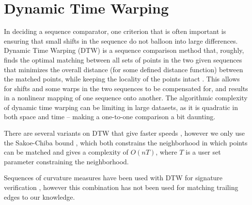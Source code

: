 \section{Dynamic Time Warping}

In deciding a sequence comparator, one criterion that is often important is ensuring that small shifts in the sequence do not balloon into large differences.
Dynamic Time Warping (DTW) is a sequence comparison method that, roughly, finds the optimal matching between all sets of points in the two given sequences that minimizes the overall distance (for some defined distance function) between the matched points, while keeping the locality of the points intact \cite{sakoe1978dynamic}.
This allows for shifts and some warps in the two sequences to be compensated for, and results in a nonlinear mapping of one sequence onto another.
The algorithmic complexity of dynamic time warping can be limiting in large datasets, as it is quadratic in both space and time -- making a one-to-one comparison a bit daunting.

There are several variants on DTW that give faster speeds \cite{salvador2007fastdtw} \cite{lemire2009faster}, however we only use the Sakoe-Chiba bound \cite{sakoe1978dynamic}, which both constrains the neighborhood in which points can be matched and gives a complexity of $O(nT)$, where $T$ is a user set parameter constraining the neighborhood.

Sequences of curvature measures have been used with DTW for signature verification \cite{munich1999continuous}, however this combination has not been used for matching trailing edges to our knowledge.

